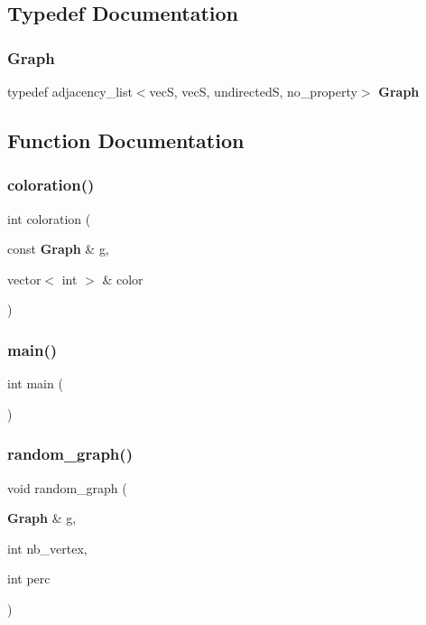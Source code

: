 \subsection{Typedef Documentation}
\mbox{\label{ameltek_8cpp_a277ad082907fab85e9bfcfe2947dc70e}} 
\subsubsection{Graph}
{\footnotesize\ttfamily typedef adjacency\+\_\+list$<$vecS, vecS, undirectedS, no\+\_\+property$>$ \textbf{ Graph}}



\subsection{Function Documentation}
\mbox{\label{ameltek_8cpp_aabbf89358df096c183be2bdd715c3052}} 
\subsubsection{coloration()}
{\footnotesize\ttfamily int coloration (\begin{DoxyParamCaption}\item[{const \textbf{ Graph} \&}]{g,  }\item[{vector$<$ int $>$ \&}]{color }\end{DoxyParamCaption})}

\mbox{\label{ameltek_8cpp_ae66f6b31b5ad750f1fe042a706a4e3d4}} 
\subsubsection{main()}
{\footnotesize\ttfamily int main (\begin{DoxyParamCaption}{ }\end{DoxyParamCaption})}

\mbox{\label{ameltek_8cpp_ae57e42e360348ab6f9fd7018a0941cab}} 
\subsubsection{random\+\_\+graph()}
{\footnotesize\ttfamily void random\+\_\+graph (\begin{DoxyParamCaption}\item[{\textbf{ Graph} \&}]{g,  }\item[{int}]{nb\+\_\+vertex,  }\item[{int}]{perc }\end{DoxyParamCaption})}

